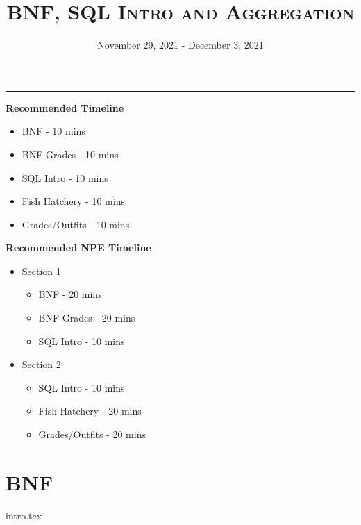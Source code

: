 \documentclass{exam}
\title{\textsc{BNF, SQL Intro and Aggregation}}
\date{November 29, 2021 - December 3, 2021}
\begin{document}
\maketitle\rule{\textwidth}{0.15em}
\fontsize{12}{15}\selectfont

\begin{blocksection}
  \begin{guide}
    \textbf{Recommended Timeline}
    \begin{itemize}
      \item BNF - 10 mins
      \item BNF Grades - 10 mins
      \item SQL Intro - 10 mins
      \item Fish Hatchery - 10 mins
      \item Grades/Outfits - 10 mins
    \end{itemize}
  \end{guide}
\end{blocksection}

\begin{blocksection}
  \begin{guide}
    \textbf{Recommended NPE Timeline}
    \begin{itemize}
      \item Section 1
            \begin{itemize}
              \item BNF - 20 mins
              \item BNF Grades - 20 mins
              \item SQL Intro - 10 mins
            \end{itemize}
      \item Section 2
            \begin{itemize}
              \item SQL Intro - 10 mins
              \item Fish Hatchery - 20 mins
              \item Grades/Outfits - 20 mins
            \end{itemize}
    \end{itemize}
  \end{guide}
\end{blocksection}

\section{BNF}
{intro.tex}
\end{document}
